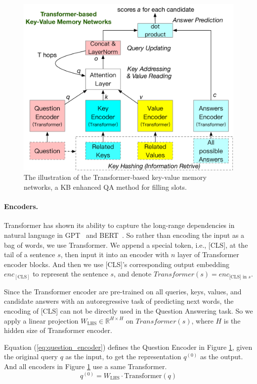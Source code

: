 \documentclass{article}
\begin{document}
\begin{figure}[!htbp]
\centering 
\includegraphics[width=1.0\columnwidth]{img/TKVMemNN.pdf} 
\caption{The illustration of the Transformer-based key-value memory networks, a KB enhanced QA method for filling slots.}
\label{fig:tkvmemnn} 
\end{figure}

\paragraph{Encoders.} 
Transformer has shown its ability to capture the long-range dependencies in natural language in GPT~\cite{radford2018improving} and BERT~\cite{devlin2019bert}. 
So rather than encoding the input as a bag of words, we use Transformer. 
We append a special token, i.e., [CLS], at the tail of a sentence $s$, then input it into an encoder with $n$ layer of Transformer encoder blocks. 
And then we use [CLS]'s corresponding output embedding $enc_{[\text{CLS}]}$ to represent the sentence $s$, and denote $Transformer(s) = enc_{\text{[CLS] in }s}$.


Since the Transformer encoder are pre-trained on all queries, keys, values, and candidate answers with an autoregressive task of predicting next words, the encoding of [CLS] can not be directly used in the Question Answering task. 
So we apply a linear projection $W_{\text{LHS}}\in \mathbb{R}^{H\times H}$ on $Transformer(s)$, where $H$ is the hidden size of Transformer encoder.

Equation (\ref{eq:question_encoder}) defines the Question Encoder in Figure \ref{fig:tkvmemnn}, given the original query $q$ as the input, to get the representation $q^{(0)}$ as the output. 
And all encoders in Figure \ref{fig:tkvmemnn} use a same Transformer.  
\begin{equation}
q^{(0)} = W_{\text{LHS}} \cdot \text{Transformer}(q)
\label{eq:question_encoder}
\end{equation}
\end{document}
